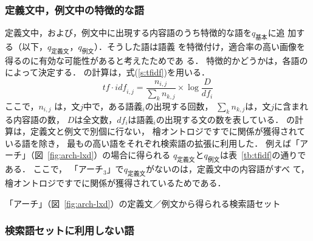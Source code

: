 \documentclass[japanese]{jnlp_1.4}
\newcommand{\tfidf}{}
\begin{document}
\subsubsection{定義文中，例文中の特徴的な語}

 定義文中，および，例文中に出現する内容語のうち特徴的な語を$q_{基本}$に追
 加する（以下，$q_{定義文}$，$q_{例文}$）．そうした語は語義
 を特徴付け，適合率の高い画像を得るのに有効な可能性があると考えたためであ
 る．
特徴的かどうかは，各語の\tfidf{} \cite{Tokunaga:1999j}によって決定する．
\tfidf{}の計算は，式(\ref{s:tfidf})を用いる．
\begin{equation}
 \mathit{tf}\cdot\mathit{idf}_{i,j} =  \frac{n_{i,j}}{\sum_{k}^{} n_{k,j}}\times \log {\frac{D}{df_i}}
 \label{s:tfidf}
\end{equation}
ここで，$n_{i,j}$ は，文$j$中で，ある語義$_i$の出現する回数，
 $\sum_{k}^{} n_{k,j}$は，文$j$に含まれる内容語の数，
 $D$は全文数，$df_i$は語義$_i$の出現する文の数を表している．
\tfidf{}の計算は，定義文と例文で別個に行ない，
檜オントロジですでに関係が獲得されている語を除き，
最も\tfidf{}の高い語をそれぞれ検索語の拡張に利用した．
例えば「アーチ」（図~\ref{fig:arch-lxd}）の場合に得られる
$q_{定義文}$と$q_{例文}$は表~\ref{tb:tfidf}の通りである．
ここで， 「アーチ$_3$」で$q_{定義文}$がないのは，定義文中の内容語がすべ
 て，檜オントロジですでに関係が獲得されているためである．

\begin{table}[t]
\caption{「アーチ」（図~\ref{fig:arch-lxd}）の定義文／例文から得られる検索語セット} 
\label{tb:tfidf}

\end{table}


 \subsubsection{検索語セットに利用しない語}
\end{document}
